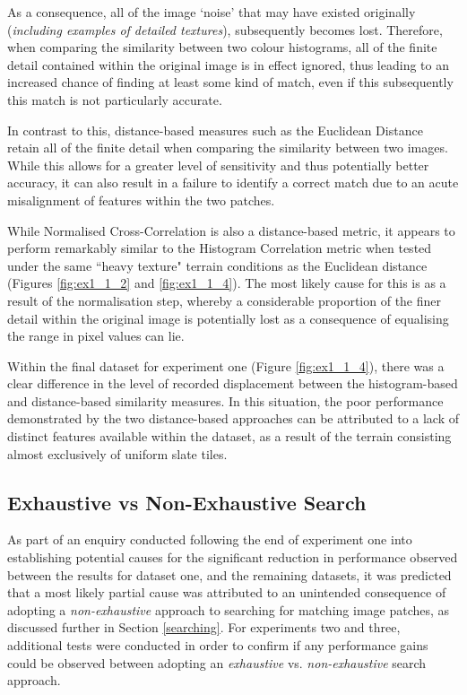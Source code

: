 As a consequence, all of the image `noise' that may have existed originally (\textit{including examples of detailed textures}), subsequently becomes lost. Therefore, when comparing the similarity between two colour histograms, all of the finite detail contained within the original image is in effect ignored, thus leading to an increased chance of finding at least some kind of match, even if this subsequently this match is not particularly accurate. 

In contrast to this, distance-based measures such as the Euclidean Distance retain all of the finite detail when comparing the similarity between two images. While this allows for a greater level of sensitivity and thus potentially better accuracy, it can also result in a failure to identify a correct match due to an acute misalignment of features within the two patches.

While Normalised Cross-Correlation is also a distance-based metric, it appears to perform remarkably similar to the Histogram Correlation metric when tested under the same ``heavy texture" terrain conditions as the Euclidean distance (Figures \ref{fig:ex1_1_2} and \ref{fig:ex1_1_4}). The most likely cause for this is as a result of the normalisation step, whereby a considerable proportion of the finer detail within the original image is potentially lost as a consequence of equalising the range in pixel values can lie. 

Within the final dataset for experiment one (Figure \ref{fig:ex1_1_4}), there was a clear difference in the level of recorded displacement between the histogram-based and distance-based similarity measures. In this situation, the poor performance demonstrated by the two distance-based approaches can be attributed to a lack of distinct features available within the dataset, as a result of the terrain consisting almost exclusively of uniform slate tiles.

\subsection{Exhaustive vs Non-Exhaustive Search}

As part of an enquiry conducted following the end of experiment one into establishing potential causes for the significant reduction in performance observed between the results for dataset one, and the remaining datasets, it was predicted that a most likely partial cause was attributed to an unintended consequence of adopting a \textit{non-exhaustive} approach to searching for matching image patches, as discussed further in Section \ref{searching}. For experiments two and three, additional tests were conducted in order to confirm if any performance gains could be observed between adopting an \textit{exhaustive} vs. \textit{non-exhaustive} search approach. 

